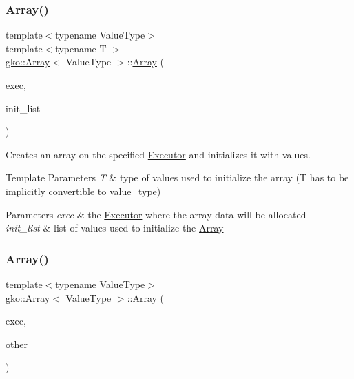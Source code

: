 \subsubsection{\texorpdfstring{Array()}{Array()}\hspace{0.1cm}{\footnotesize\ttfamily [7/11]}}
{\footnotesize\ttfamily template$<$typename Value\+Type$>$ \\
template$<$typename T $>$ \\
\hyperlink{classgko_1_1Array}{gko\+::\+Array}$<$ Value\+Type $>$\+::\hyperlink{classgko_1_1Array}{Array} (\begin{DoxyParamCaption}\item[{std\+::shared\+\_\+ptr$<$ const \hyperlink{classgko_1_1Executor}{Executor} $>$}]{exec,  }\item[{std\+::initializer\+\_\+list$<$ T $>$}]{init\+\_\+list }\end{DoxyParamCaption})}



Creates an array on the specified \hyperlink{classgko_1_1Executor}{Executor} and initializes it with values. 


\begin{DoxyTemplParams}{Template Parameters}
{\em T} & type of values used to initialize the array (T has to be implicitly convertible to value\+\_\+type)\\
\hline
\end{DoxyTemplParams}

\begin{DoxyParams}{Parameters}
{\em exec} & the \hyperlink{classgko_1_1Executor}{Executor} where the array data will be allocated \\
\hline
{\em init\+\_\+list} & list of values used to initialize the \hyperlink{classgko_1_1Array}{Array} \\
\hline
\end{DoxyParams}
\mbox{\label{classgko_1_1Array_ad03ebd9c7e7d63fc3b8b7a0a9ba8d16b}} 
\subsubsection{\texorpdfstring{Array()}{Array()}\hspace{0.1cm}{\footnotesize\ttfamily [8/11]}}
{\footnotesize\ttfamily template$<$typename Value\+Type$>$ \\
\hyperlink{classgko_1_1Array}{gko\+::\+Array}$<$ Value\+Type $>$\+::\hyperlink{classgko_1_1Array}{Array} (\begin{DoxyParamCaption}\item[{std\+::shared\+\_\+ptr$<$ const \hyperlink{classgko_1_1Executor}{Executor} $>$}]{exec,  }\item[{const \hyperlink{classgko_1_1Array}{Array}$<$ Value\+Type $>$ \&}]{other }\end{DoxyParamCaption})}



